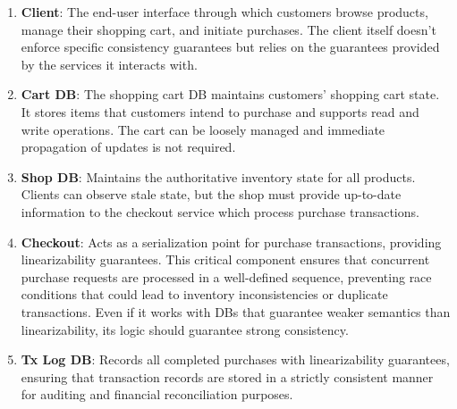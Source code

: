 \begin{enumerate}[leftmargin=*, noitemsep,topsep=0pt]
\item \textbf{Client}: The end-user interface through which
  customers browse products, manage their shopping cart, and
  initiate purchases. The client itself doesn't enforce specific
  consistency guarantees but relies on the guarantees provided by
  the services it interacts with.

\item \textbf{Cart DB}: The shopping cart DB maintains customers'
  shopping cart state. It stores items that customers intend to
  purchase and supports read and write operations. The cart can be
  loosely managed and immediate propagation of updates is not required.

\item \textbf{Shop DB}: Maintains the authoritative inventory state
  for all products. Clients can observe stale state, but the shop must provide
  up-to-date information to the checkout service which process purchase
  transactions.

\item \textbf{Checkout}: Acts as a serialization point for
  purchase transactions, providing linearizability guarantees. This
  critical component ensures that concurrent purchase requests are
  processed in a well-defined sequence, preventing race conditions
  that could lead to inventory inconsistencies or duplicate transactions.
  Even if it works with DBs that guarantee weaker semantics than
  linearizability,
  its logic should guarantee strong consistency.

\item \textbf{Tx Log DB}: Records all completed purchases
  with linearizability guarantees, ensuring that transaction
  records are stored in a strictly consistent manner for auditing
  and financial reconciliation purposes.
\end{enumerate}

